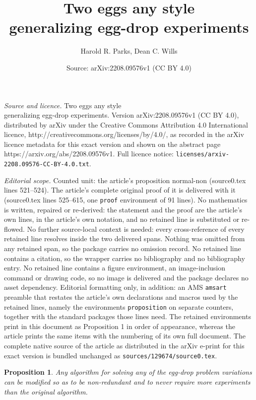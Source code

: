 \documentclass[10pt,a4paper]{amsart}
\title{Two eggs any style \\ generalizing egg-drop experiments}
\author{Harold R. Parks, Dean C. Wills}
\date{Source: arXiv:2208.09576v1 (CC BY 4.0)}
\newtheorem{proposition}{Proposition}
\begin{document}
\maketitle

\noindent\emph{Source and licence.} Two eggs any style \\ generalizing egg-drop experiments. Version arXiv:2208.09576v1 (CC BY 4.0), distributed by arXiv under the Creative Commons Attribution 4.0 International licence, http://creativecommons.org/licenses/by/4.0/, as recorded in the arXiv licence metadata for this exact version and shown on the abstract page https://arxiv.org/abs/2208.09576v1. Full licence notice: \texttt{licenses/arxiv-2208.09576-CC-BY-4.0.txt}.\par\smallskip

\noindent\textit{Editorial scope.} Counted unit: the article's proposition normal-non (source0.tex lines 521--524). The article's complete original proof of it is delivered with it (source0.tex lines 525--615, one \texttt{proof} environment of 91 lines). No mathematics is written, repaired or re-derived: the statement and the proof are the article's own lines, in the article's own notation, and no retained line is substituted or re-flowed.  No further source-local context is needed: every cross-reference of every retained line resolves inside the two delivered spans.  Nothing was omitted from any retained span, so the package carries no omission record.  No retained line contains a citation, so the wrapper carries no bibliography and no bibliography entry.  No retained line contains a figure environment, an image-inclusion command or drawing code, so no image is delivered and the package declares no asset dependency.  Editorial formatting only, in addition: an AMS \texttt{amsart} preamble that restates the article's own declarations and macros used by the retained lines, namely the environments \texttt{proposition} on separate counters, together with the standard packages those lines need.  The retained environments print in this document as Proposition 1 in order of appearance, whereas the article prints the same items with the numbering of its own full document.  The complete native source of the article as distributed in the arXiv e-print for this exact version is bundled unchanged as \texttt{sources/129674/source0.tex}.
\begin{proposition}\label{normal-non} 
Any algorithm for solving any of the egg-drop  problem variations  can be modified 
so as to be non-redundant and to never require more experiments than the original algorithm. 
\end{proposition}
\end{document}
